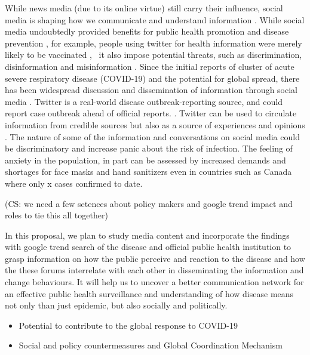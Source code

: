 While news media (due to its online virtue) still carry their influence, social media is shaping how we communicate and understand information \citep{LiuSieg19}.  While social media undoubtedly provided benefits for public health promotion and disease prevention \cite{BascHill20, SunYang20}, for example, people using twitter for health information were merely likely to be vaccinated \citep{AhmeQuin18},  it also impose potential threats, such as discrimination, disinformation and misinformation \citep{McKevanS19}.  Since the initial reports of cluster of acute severe respiratory disease (COVID-19) and the potential for global spread, there has been widespread discussion and dissemination of information through social media \citep{?}.  Twitter is a real-world disease outbreak-reporting source, and could report case outbreak ahead of official reports. \citep{YoutDara19}.  Twitter can be used to circulate information from credible sources but also as a source of experiences and opinions \citep{ChewEyes10}.  The nature of some of the information and conversations on social media could be discriminatory and increase panic about the risk of infection. The feeling of anxiety in the population, in part can be assessed by increased demands and shortages for face masks and hand sanitizers even in countries such as Canada where only x cases confirmed to date. 

(CS:  we need a few setences about policy makers and google trend impact and roles to tie this all together)

In this proposal, we plan to study media content and incorporate the findings with google trend search of the disease and official public health institution to grasp information on how the public perceive and reaction to the disease and how the these forums interrelate with each other in disseminating the information and change behaviours.  It will help us to uncover a better communication network for an effective public health surveillance and understanding of how disease means not only than just epidemic, but also socially and politically.


\begin{itemize}
\item{Potential to contribute to the global response to COVID-19}
\item{Social and policy countermeasures and Global Coordination Mechanism}
\end{itemize}

